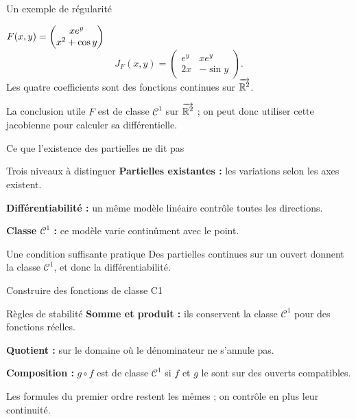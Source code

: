 \begin{frame}[t]{Un exemple de régularité}
\coursanalyse
\begin{exemple}{$F(x,y)=\begin{pmatrix}xe^y\\x^2+\cos y\end{pmatrix}$}
\[J_F(x,y)=\begin{pmatrix}e^y&xe^y\\2x&-\sin y\end{pmatrix}.\]
Les quatre coefficients sont des fonctions continues sur $\overrightarrow{\mathbb R^{2}}$.
\end{exemple}
\begin{resultat}{La conclusion utile}
$F$ est de classe $\mathcal C^1$ sur $\overrightarrow{\mathbb R^{2}}$ ; on peut donc utiliser cette jacobienne pour calculer sa différentielle.
\end{resultat}
\end{frame}

\begin{frame}[t]{Ce que l’existence des partielles ne dit pas}
\coursanalyse
\begin{cours}{Trois niveaux à distinguer}
\textbf{Partielles existantes :} les variations selon les axes existent.

\medskip
\textbf{Différentiabilité :} un même modèle linéaire contrôle toutes les directions.

\medskip
\textbf{Classe $\mathcal C^1$ :} ce modèle varie continûment avec le point.
\end{cours}
\begin{resultat}{Une condition suffisante pratique}
Des partielles continues sur un ouvert donnent la classe $\mathcal C^1$, et donc la différentiabilité.
\end{resultat}
\end{frame}

\begin{frame}[t]{Construire des fonctions de classe C1}
\coursanalyse
\begin{theoreme}{Règles de stabilité}
\textbf{Somme et produit :} ils conservent la classe $\mathcal C^1$ pour des fonctions réelles.

\medskip
\textbf{Quotient :} sur le domaine où le dénominateur ne s'annule pas.

\medskip
\textbf{Composition :} $g\circ f$ est de classe $\mathcal C^1$ si $f$ et $g$ le sont sur des ouverts compatibles.
\end{theoreme}
\vfill Les formules du premier ordre restent les mêmes ; on contrôle en plus leur continuité.
\end{frame}


